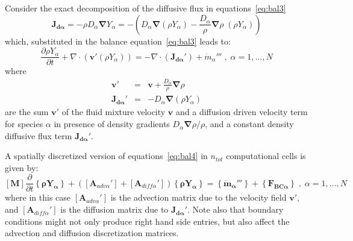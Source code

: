 \documentclass[12pt]{article}
\begin{document}
Consider the exact decomposition of the diffusive flux in equations~\eqref{eq:bal3}
%
\begin{equation}
   \mathbf{J_{d \alpha}} = - \rho D_\alpha \boldsymbol{\nabla} Y_\alpha =  - \left( D_\alpha \boldsymbol{\nabla} ( \rho Y_\alpha)
   - \frac{D_\alpha}{\rho} \boldsymbol{\nabla} \rho \; ( \rho Y_\alpha) \right) \label{eq:expdfl2}
\end{equation}
%
which, substituted in the balance equation~\eqref{eq:bal3} leads to:
%
\begin{equation}
 \frac{\partial \rho Y_\alpha}{ \partial t} + \nabla \cdot \left(  \mathbf{v}' (\rho Y_\alpha)   \right) = - \nabla \cdot \left(  \mathbf{J_{d \alpha}'} \right) + \dot{m}_\alpha''' \; , \; \alpha=1,\dots,N \label{eq:bal4}
\end{equation}
%
where
%
\begin{eqnarray}
  \mathbf{v}' &=& \mathbf{v} + \frac{D_\alpha}{\rho} \boldsymbol{\nabla} \rho  \label{eq:vprime} \\
   \mathbf{J_{d \alpha}'} &=& -D_\alpha \boldsymbol{\nabla}  (\rho Y_\alpha )  \label{eq:jdaprime}
\end{eqnarray}
%
are the sum $\mathbf{v}'$ of the fluid mixture velocity $\mathbf{v}$ and a diffusion driven velocity term for species $\alpha$ in presence of density gradients $D_\alpha \boldsymbol{\nabla} \rho / \rho $, and a constant density diffusive flux term $\mathbf{J_{d \alpha}'}$.

A spatially discretized version of equations~\eqref{eq:bal4} in $n_{tot}$ computational cells is given by:
%
\begin{equation}
\left[ \mathbf{M} \right] \frac{\partial}{\partial t} \left\{ \mathbf{\rho Y_\alpha} \right\} + \left( \left[ \mathbf{A}_{adv \alpha}'  \right] +\left[ \mathbf{A}_{diff \alpha}' \right] \right) \left\{ \mathbf{\rho Y_\alpha} \right\}   =  \left\{  \mathbf{\dot{m}_\alpha'''} \right\} +  \left\{ \mathbf{F_{BC \alpha}} \right\} \; , \; \alpha=1,\dots,N \label{eq:discbal4}
\end{equation}
%
where in this case $ \left[ \mathbf{A}_{adv \alpha}'  \right]$ is the advection matrix due to the velocity field $\mathbf{v}'$, and  $\left[ \mathbf{A}_{diff \alpha}' \right]$ is the diffusion matrix due to $ \mathbf{J_{d \alpha}'} $. Note also that boundary conditions might not only produce right hand side entries, but also affect the advection and diffusion discretization matrices.



\end{document}
